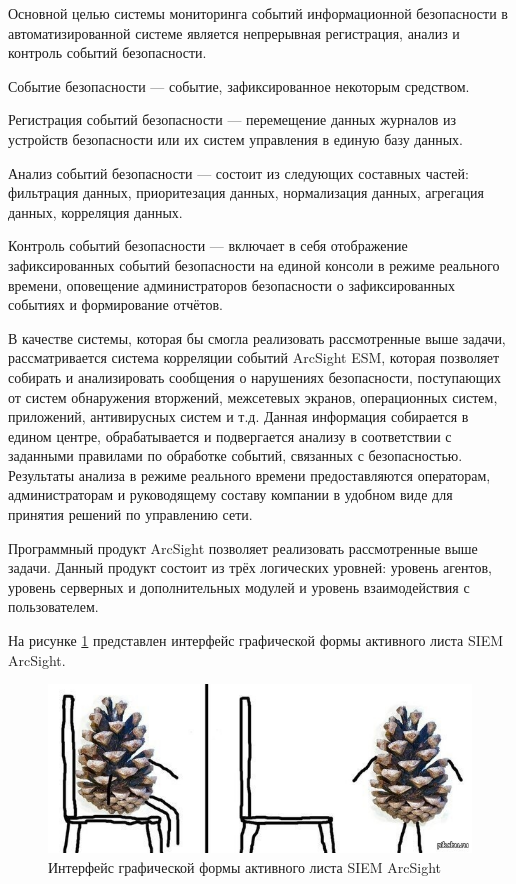 Основной целью системы мониторинга событий информационной безопасности в автоматизированной системе является непрерывная регистрация, анализ и контроль событий безопасности.

Событие безопасности --- событие, зафиксированное некоторым средством.

Регистрация событий безопасности --- перемещение данных журналов из устройств безопасности или их систем управления в единую базу данных.

Анализ событий безопасности --- состоит из следующих составных частей: фильтрация данных, приоритезация данных, нормализация данных, агрегация данных, корреляция данных.

Контроль событий безопасности --- включает в себя отображение зафиксированных событий безопасности на единой консоли в режиме реального времени, оповещение администраторов безопасности о зафиксированных событиях и формирование отчётов.

В качестве системы, которая бы смогла реализовать рассмотренные выше задачи, рассматривается система корреляции событий ArcSight ESM, которая позволяет собирать и анализировать сообщения о нарушениях безопасности, поступающих от систем обнаружения вторжений, межсетевых экранов, операционных систем, приложений, антивирусных систем и т.д. Данная информация собирается в едином центре, обрабатывается и подвергается анализу в соответствии с заданными правилами по обработке событий, связанных с безопасностью. Результаты анализа в режиме реального времени предоставляются операторам, администраторам и руководящему составу компании в удобном виде для принятия решений по управлению сети.

Программный продукт ArcSight позволяет реализовать рассмотренные выше задачи. Данный продукт состоит из трёх логических уровней: уровень агентов, уровень серверных и дополнительных модулей и уровень взаимодействия с пользователем.

На рисунке \ref{ArcSight4} представлен интерфейс графической формы активного листа SIEM ArcSight. 

\begin{figure}[H]
  \centering
  \includegraphics[width=1\textwidth]{resources/12.jpg}
  \caption{Интерфейс графической формы активного листа SIEM ArcSight}
  \label{ArcSight4}
\end{figure}

